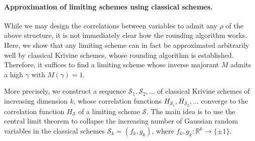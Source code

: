 


\paragraph{Approximation of limiting schemes using classical schemes.}
While we may design the correlations between variables to admit any \(\rho\) of the above structure, it is not immediately clear how the rounding algorithm works. 
Here, we show that any limiting scheme can in fact be approximated arbitrarily well by classical Krivine schemes, whose rounding algorithm is established. 
Therefore, it suffices to find a limiting scheme whose inverse majorant $M$ admits a high $\gamma$ with $M(\gamma) = 1$.

More precisely, we construct a sequence $\mathcal{S}_1, \mathcal{S}_2, \ldots$ of classical Krivine schemes of increasing dimension \(k\), whose correlation functions $H_{\mathcal{S}_1}, H_{\mathcal{S}_2}, \dots$ converge to the correlation function $H_{\mathcal{S}}$ of a limiting scheme $\mathcal{S}$.
The main idea is to use the central limit theorem to collapse the increasing number of Gaussian random variables in the classical schemes \(\mathcal{S}_k = (f_k, g_k)\), where \(f_k, g_k : \mathbb{R}^k \to \{\pm 1\}\).

  





